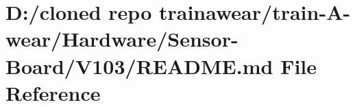 \hypertarget{_hardware_2_sensor-_board_2_v103_2_r_e_a_d_m_e_8md}{}\section{D\+:/cloned repo trainawear/train-\/\+A-\/wear/\+Hardware/\+Sensor-\/\+Board/\+V103/\+R\+E\+A\+D\+ME.md File Reference}
\label{_hardware_2_sensor-_board_2_v103_2_r_e_a_d_m_e_8md}

